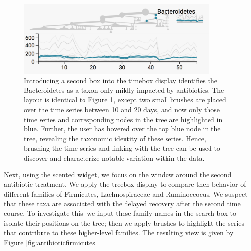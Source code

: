 \begin{figure}

{\centering \includegraphics[width=375px]{figure/treelapse/antibiotic_bacteroidetes}

}

\caption{Introducing a second box into the timebox display identifies the
  Bacteroidetes as a taxon only mildly impacted by antibiotics. The layout is
  identical to Figure 1, except two small brushes are placed over the time
  series between 10 and 20 days, and now only those time series and
  corresponding nodes in the tree are highlighted in blue. Further, the user has
  hovered over the top blue node in the tree, revealing the taxonomic identity
  of these series. Hence, brushing the time series and linking with the tree can
  be used to discover and characterize notable variation within the
  data.\label{fig:antibioticbacteroidetes}}
\end{figure}

Next, using the scented widget, we focus on the window around the second
antibiotic treatment. We apply the treebox display to compare then behavior of
different families of Firmicutes, Lachnospiraceae and Ruminoccocus. We suspect
that these taxa are associated with the delayed recovery after the second time
course. To investigate this, we input these family names in the search box to
isolate their positions on the tree; then we apply brushes to highlight the
series that contribute to these higher-level families. The resulting view is
given by Figure \ref{fig:antibioticfirmicutes}

